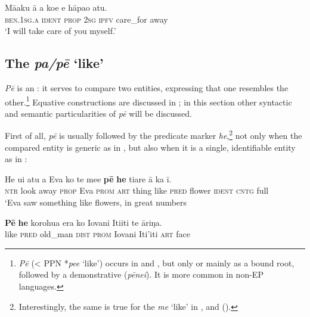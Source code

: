 \ea\label{ex:4.290}
\gll Mā{\ꞌ}aku {\ꞌ}ā a koe e hāpa{\ꞌ}o atu. \\
\textsc{ben.1sg.a} \textsc{ident} \textsc{prop} \textsc{2sg} \textsc{ipfv} care\_for away \\

\glt 
‘I will take care of you myself.’ \textstyleExampleref{[R310.067]} 
\z
{}
\subsection{The  \textit{pa/pē} ‘like’}\label{sec:4.7.8}
\textit{Pē} is an  : it serves to compare two entities, expressing that one resembles the other.\footnote{\label{fn:237}\textit{Pē} ({\textless} PPN *\textit{pee} ‘like’) occurs in  and , but only or mainly as a bound root, followed by a demonstrative (\textit{pēnei}). It is more common in non-EP languages.} Equative constructions are discussed in ; in this section other syntactic and semantic particularities of \textit{pē} will be discussed.

First of all, \textit{pē} is usually followed by the predicate marker \textit{he},\footnote{\label{fn:238}Interestingly, the same is true for the  \textit{me} ‘like’ in ,  and  ().}  not only when the compared entity is generic as in , but also when it is a single, identifiable entity as in :

\ea\label{ex:4.291}
\gll He u{\ꞌ}i atu a Eva ko te me{\ꞌ}e \textbf{pē} \textbf{he} tiare {\ꞌ}ā ka {\ꞌ}ī.\\
\textsc{ntr} look away \textsc{prop} Eva \textsc{prom} \textsc{art} thing like \textsc{pred} flower \textsc{ident} \textsc{cntg} full\\

\glt 
‘Eva saw something like flowers, in great numbers 
\z

\ea\label{ex:4.292}
\gll \textbf{Pē} \textbf{he} korohu{\ꞌ}a era ko Iovani {\ꞌ}Iti{\ꞌ}iti te {\ꞌ}āriŋa.\\
like \textsc{pred} old\_man \textsc{dist} \textsc{prom} Iovani Iti’iti \textsc{art} face\\

